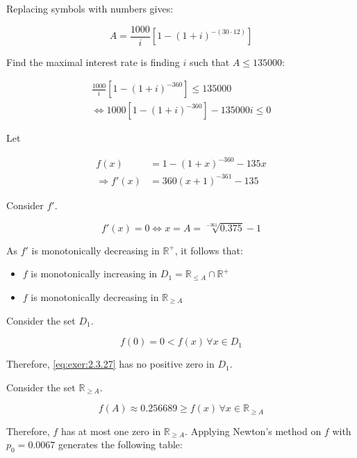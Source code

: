 \documentclass[../../../../Assignments]{subfiles}
\begin{document}
\begin{solution}
    Replacing symbols with numbers gives:

    \[A = \frac{\num{1000}}{i} [1 - (1 + i)^{-(30 \cdot 12)}]\]

    Find the maximal interest rate is finding \(i\) such that \(A \leq
    \num{135000}\):

    \begin{gather*}
        \frac{\num{1000}}{i} [1 - (1 + i)^{-360}] \leq \num{135000} \\
        \iff \num{1000} [1 - (1 + i)^{-360}] - \num{135000} i \leq 0 \tag{*}\label{eq:exer:2.3.27}
    \end{gather*}

    Let

    \begin{align*}
                     f(x) &= 1 - (1 + x)^{-360} - 135x \\
        \Rightarrow f'(x) &= 360(x + 1)^{-361} - 135
    \end{align*}

    Consider \(f'\).

    \[f'(x) = 0 \iff x = A = \sqrt[-361]{\num{0.375}} - 1\]

    As \(f'\) is monotonically decreasing in \(\mathbb{R}^+\), it follows that:

    \begin{itemize}
        \item \(f\) is monotonically increasing in \(D_1 = \mathbb{R}_{\leq A} \cap \mathbb{R}^+\)
        \item \(f\) is monotonically decreasing in \(\mathbb{R}_{\geq A}\)
    \end{itemize}

    Consider the set \(D_1\).

    \[f(0) = 0 < f(x) \, \forall x \in D_1\]

    Therefore, \eqref{eq:exer:2.3.27} has no positive zero in \(D_1\).

    Consider the set \(\mathbb{R}_{\geq A}\).

    \[f(A) \approx \num{0.256689} \geq f(x) \, \forall x \in \mathbb{R}_{\geq A}\]

    Therefore, \(f\) has at most one zero in \(\mathbb{R}_{\geq A}\). Applying
    Newton's method on \(f\) with \(p_0 = \num{0.0067}\) generates the following
    table:


\end{solution}
\end{document}
